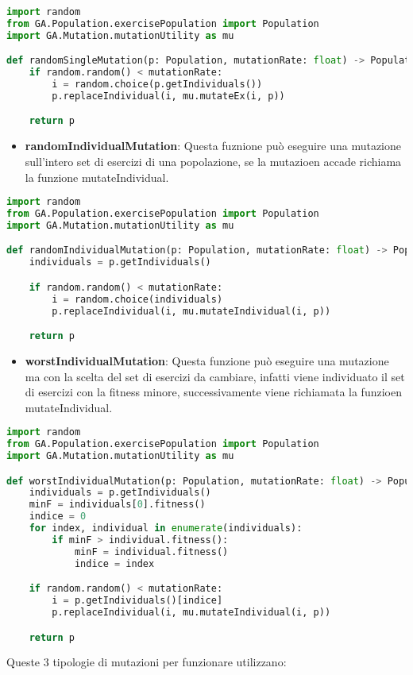 \documentclass{article}
\begin{document}
\begin{lstlisting}[language=Python, breaklines, no caption]
import random
from GA.Population.exercisePopulation import Population
import GA.Mutation.mutationUtility as mu

def randomSingleMutation(p: Population, mutationRate: float) -> Population:
    if random.random() < mutationRate:
        i = random.choice(p.getIndividuals())
        p.replaceIndividual(i, mu.mutateEx(i, p))

    return p
\end{lstlisting}

\begin{itemize}
\item\textbf{randomIndividualMutation}: Questa fuznione può eseguire una mutazione sull'intero set di esercizi di una popolazione, se la mutazioen accade richiama la funzione mutateIndividual.
\end{itemize}

\begin{lstlisting}[language=Python, breaklines, no caption]
import random
from GA.Population.exercisePopulation import Population
import GA.Mutation.mutationUtility as mu

def randomIndividualMutation(p: Population, mutationRate: float) -> Population:
    individuals = p.getIndividuals()

    if random.random() < mutationRate:
        i = random.choice(individuals)
        p.replaceIndividual(i, mu.mutateIndividual(i, p))

    return p
\end{lstlisting}

\pagebreak

\begin{itemize}
\item\textbf{worstIndividualMutation}: Questa funzione può eseguire una mutazione ma con la scelta del set di esercizi da cambiare, infatti viene individuato il set di esercizi con la fitness minore, successivamente viene richiamata la funzioen mutateIndividual.
\end{itemize}

\begin{lstlisting}[language=Python, breaklines, no caption]
import random
from GA.Population.exercisePopulation import Population
import GA.Mutation.mutationUtility as mu

def worstIndividualMutation(p: Population, mutationRate: float) -> Population:
    individuals = p.getIndividuals()
    minF = individuals[0].fitness()
    indice = 0
    for index, individual in enumerate(individuals):
        if minF > individual.fitness():
            minF = individual.fitness()
            indice = index

    if random.random() < mutationRate:
        i = p.getIndividuals()[indice]
        p.replaceIndividual(i, mu.mutateIndividual(i, p))

    return p
        \end{lstlisting}
    Queste 3 tipologie di mutazioni per funzionare utilizzano:
\end{document}
